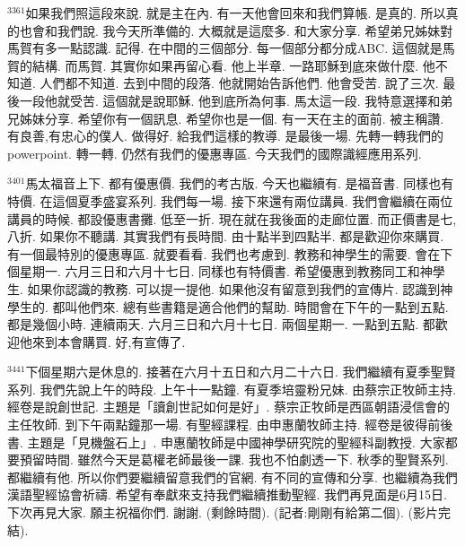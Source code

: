 \documentclass{book}
\begin{document}
$^{3361}$如果我們照這段來說.
就是主在內.
有一天他會回來和我們算帳.
是真的.
所以真的也會和我們說.
我今天所準備的.
大概就是這麼多.
和大家分享.
希望弟兄姊妹對馬賀有多一點認識.
記得.
在中間的三個部分.
每一個部分都分成ABC.
這個就是馬賀的結構.
而馬賀.
其實你如果再留心看.
他上半章.
一路耶穌到底來做什麼.
他不知道.
人們都不知道.
去到中間的段落.
他就開始告訴他們.
他會受苦.
說了三次.
最後一段他就受苦.
這個就是說耶穌.
他到底所為何事.
馬太這一段.
我特意選擇和弟兄姊妹分享.
希望你有一個訊息.
希望你也是一個.
有一天在主的面前.
被主稱讚.
有良善,有忠心的僕人.
做得好.
給我們這樣的教導.
是最後一場.
先轉一轉我們的powerpoint.
轉一轉.
仍然有我們的優惠專區.
今天我們的國際識經應用系列.

$^{3401}$馬太福音上下.
都有優惠價.
我們的考古版.
今天也繼續有.
是福音書.
同樣也有特價.
在這個夏季盛宴系列.
我們每一場.
接下來還有兩位講員.
我們會繼續在兩位講員的時候.
都設優惠書攤.
低至一折.
現在就在我後面的走廊位置.
而正價書是七,八折.
如果你不聽講.
其實我們有長時間.
由十點半到四點半.
都是歡迎你來購買.
有一個最特別的優惠專區.
就要看看.
我們也考慮到.
教務和神學生的需要.
會在下個星期一.
六月三日和六月十七日.
同樣也有特價書.
希望優惠到教務同工和神學生.
如果你認識的教務.
可以提一提他.
如果他沒有留意到我們的宣傳片.
認識到神學生的.
都叫他們來.
總有些書籍是適合他們的幫助.
時間會在下午的一點到五點.
都是幾個小時.
連續兩天.
六月三日和六月十七日.
兩個星期一.
一點到五點.
都歡迎他來到本會購買.
好,有宣傳了.

$^{3441}$下個星期六是休息的.
接著在六月十五日和六月二十六日.
我們繼續有夏季聖賢系列.
我們先說上午的時段.
上午十一點鐘.
有夏季培靈粉兄妹.
由蔡宗正牧師主持.
經卷是說創世記.
主題是「讀創世記如何是好」.
蔡宗正牧師是西區朝語浸信會的主任牧師.
到下午兩點鐘那一場.
有聖經課程.
由申惠蘭牧師主持.
經卷是彼得前後書.
主題是「見機盤石上」.
申惠蘭牧師是中國神學研究院的聖經科副教授.
大家都要預留時間.
雖然今天是葛權老師最後一課.
我也不怕劇透一下.
秋季的聖賢系列.
都繼續有他.
所以你們要繼續留意我們的官網.
有不同的宣傳和分享.
也繼續為我們漢語聖經協會祈禱.
希望有奉獻來支持我們繼續推動聖經.
我們再見面是6月15日.
下次再見大家.
願主祝福你們.
謝謝.
(剩餘時間).
(記者:剛剛有給第二個).
(影片完結).
\newpage
\end{document}
